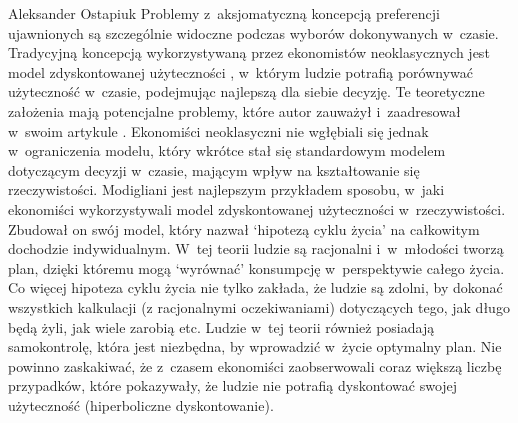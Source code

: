 \begin{artplenv}{Aleksander Ostapiuk}
Problemy z~aksjomatyczną koncepcją preferencji ujawnionych są szczególnie widoczne podczas wyborów
dokonywanych w~czasie. Tradycyjną koncepcją wykorzystywaną przez ekonomistów neoklasycznych jest model zdyskontowanej użyteczności
\parencite{samuelson_note_1937},
w~którym ludzie potrafią porównywać użyteczność w~czasie, podejmując
najlepszą dla siebie decyzję. Te teoretyczne założenia mają potencjalne problemy, które autor
zauważył i~zaadresował w~swoim artykule
\parencite{samuelson_note_1937}.
Ekonomiści neoklasyczni nie wgłębiali się jednak w~ograniczenia modelu,
który wkrótce stał się standardowym modelem dotyczącym decyzji w~czasie, mającym wpływ na
kształtowanie się rzeczywistości. Modigliani
\parencite*{modigliani_life_1966}
jest najlepszym przykładem sposobu, w~jaki
ekonomiści wykorzystywali model zdyskontowanej użyteczności w~rzeczywistości. Zbudował on swój model, który nazwał
`hipotezą cyklu życia' na całkowitym dochodzie indywidualnym. W~tej teorii ludzie są racjonalni i~w~młodości tworzą
plan, dzięki któremu mogą `wyrównać' konsumpcję w~perspektywie całego życia. Co więcej hipoteza cyklu życia nie tylko
zakłada, że ludzie są zdolni, by dokonać wszystkich kalkulacji (z racjonalnymi oczekiwaniami) dotyczących tego, jak
długo będą żyli, jak wiele zarobią etc. Ludzie w~tej teorii również posiadają samokontrolę, która jest niezbędna, by
wprowadzić w~życie optymalny plan. Nie powinno zaskakiwać, że z~czasem ekonomiści zaobserwowali coraz większą liczbę
przypadków, które pokazywały, że ludzie nie potrafią dyskontować swojej użyteczność (hiperboliczne dyskontowanie).


\end{artplenv}
